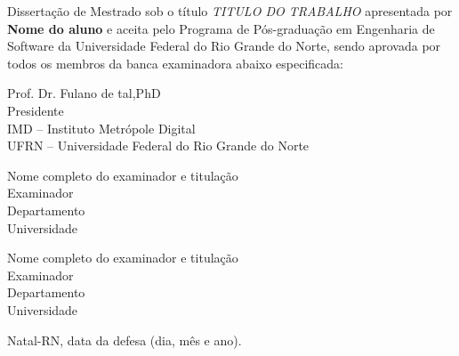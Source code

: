 \begin{folhadeaprovacao}
	\setlength{\ABNTsignthickness}{0.4pt}
	\setlength{\ABNTsignwidth}{10cm}
	
	\noindent 
	Dissertação de Mestrado sob o título \textit{TITULO DO TRABALHO} apresentada por \textbf{Nome do aluno} e aceita pelo Programa de Pós-graduação em Engenharia de Software da Universidade Federal do Rio Grande do Norte, sendo aprovada por todos os membros da banca examinadora abaixo especificada:
		
	\assinatura
	{
		Prof. Dr. Fulano de tal,PhD   			                  \\
		{\small Presidente}											          \smallskip\\ 
		{\footnotesize
			IMD -- Instituto Metrópole Digital		   \\
		  	UFRN -- Universidade Federal do Rio Grande do Norte
		}
   }
      
   \assinatura
	{
      Nome completo do examinador e titulação   			                  \\
		{\small Examinador}											          \smallskip\\ 
		{\footnotesize
			Departamento		\\
		  	Universidade
		}
   }   
   
   \assinatura
	{
      Nome completo do examinador e titulação   			                  \\
		{\small Examinador}											          \smallskip\\ 
		{\footnotesize
			Departamento		\\
		  	Universidade
		}
	}
		
	\vfill
	
	\begin{center}
		Natal-RN, data da defesa (dia, mês e ano).
	\end{center}
\end{folhadeaprovacao}
